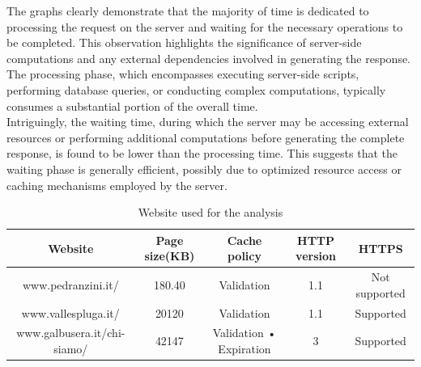 \documentclass[eng]{class}
\begin{document}
The graphs clearly demonstrate that the majority of time is dedicated to processing the request on the server and waiting for the necessary operations to be completed.
This observation highlights the significance of server-side computations and any external dependencies involved in generating the response.
The processing phase, which encompasses executing server-side scripts, performing database queries,
or conducting complex computations, typically consumes a substantial portion of the overall time.\\
Intriguingly, the waiting time, during which the server may be accessing external resources or performing additional computations
before generating the complete response, is found to be lower than the processing time. This suggests that the waiting phase is generally efficient,
possibly due to optimized resource access or caching mechanisms employed by the server.
\begin{table}[H]
  \tiny
  \centering
  \begin{tabular}{|c|c|c|c|c|}
    \hline
    \linewidth=0cm
    Website                     & Page size(KB) & Cache policy            & HTTP version & HTTPS         \\
    \hline
    www.pedranzini.it/          & 180.40        & Validation              & 1.1          & Not supported \\
    www.vallespluga.it/         & 20120         & Validation              & 1.1          & Supported     \\
    www.galbusera.it/chi-siamo/ & 42147         & Validation • Expiration & 3            & Supported     \\
    \hline
  \end{tabular}
  \caption{Website used for the analysis}
  \label{tab-3}
\end{table}
\end{document}
